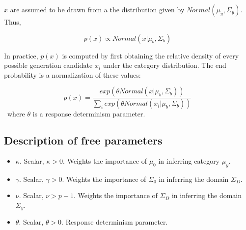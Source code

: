 \documentclass[12pt]{article}
\begin{document}
$x$ are assumed to be drawn from a the distribution given by $Normal(\mu_{y}, \Sigma_{y})$. Thus, 


\begin{equation}
  p(x) \propto Normal(x | \mu_{b}, \Sigma_{b})
\end{equation}

In practice, $p(x)$ is computed by first obtaining the relative density of every possible generation candidate $x_i$ under the category distribution. The end probability is a normalization of these values:

\begin{equation}
  p(x) = \dfrac
    {exp( \theta Normal(x | \mu_{b}, \Sigma_{b}))}
    {\sum_i exp( \theta Normal(x_i |\mu_{b}, \Sigma_{b}))} 
\end{equation}
\
where $\theta$ is a response determinism parameter.

\subsection*{Description of free parameters}

\begin{itemize}
    \setlength\itemsep{-0.5em}
    \item $\kappa$. Scalar, $\kappa>0$. Weights the importance of $\mu_{0}$ in inferring category $\mu_{y}$.
    \item $\gamma$. Scalar, $\gamma>0$. Weights the importance of $\Sigma_{0}$ in inferring the domain $\Sigma_{D}$.
    \item $\nu$. Scalar, $\nu > p-1$. Weights the importance of $\Sigma_{D}$ in inferring the domain $\Sigma_{y}$.
    \item $\theta$. Scalar, $\theta > 0$. Response determinism parameter.
\end{itemize}
\end{document}
